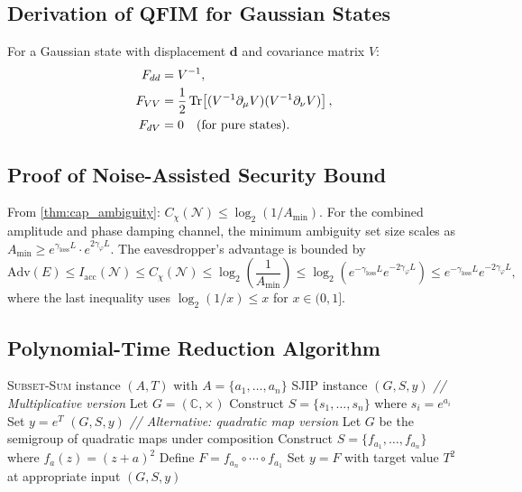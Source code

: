 \documentclass[12pt,a4paper]{article}
\theoremstyle{definition}
\theoremstyle{plain}
\begin{document}
\subsection{Derivation of QFIM for Gaussian States}

For a Gaussian state with displacement $\mathbf{d}$ and covariance matrix $V$:
\begin{align}
F_{dd} &= V^{-1}, \\
F_{VV} &= \frac{1}{2}\Tr\!\left[(V^{-1}\partial_\mu V)(V^{-1}\partial_\nu V)\right], \\
F_{dV} &= 0\quad\text{(for pure states)}.
\end{align}

\subsection{Proof of Noise-Assisted Security Bound}

From \cref{thm:cap_ambiguity}: $C_\chi(\mathcal{N})\le\log_2(1/A_{\min})$.
For the combined amplitude and phase damping channel, the minimum ambiguity set
size scales as $A_{\min}\ge e^{\gamma_{\mathrm{loss}}L}\cdot e^{2\gamma_\varphi L}$.
The eavesdropper's advantage is bounded by
\begin{equation}
\mathrm{Adv}(E)\le I_{\mathrm{acc}}(\mathcal{N})\le C_\chi(\mathcal{N})\le\log_2\!\left(\frac{1}{A_{\min}}\right)
\le\log_2\!\left(e^{-\gamma_{\mathrm{loss}}L}e^{-2\gamma_\varphi L}\right)\le e^{-\gamma_{\mathrm{loss}}L}e^{-2\gamma_\varphi L},
\end{equation}
where the last inequality uses $\log_2(1/x)\le x$ for $x\in(0,1]$.

\subsection{Polynomial-Time Reduction Algorithm}

\begin{algorithm}[H]
\caption{Polynomial-Time Reduction: \textsc{Subset-Sum} to SJIP}
\begin{algorithmic}[1]
\Require \textsc{Subset-Sum} instance $(A,T)$ with $A=\{a_1,\dots,a_n\}$
\Ensure SJIP instance $(G,S,y)$
\State \textit{// Multiplicative version}
\State Let $G=(\mathbb{C},\times)$
\State Construct $S=\{s_1,\dots,s_n\}$ where $s_i=e^{a_i}$
\State Set $y=e^T$
\Return $(G,S,y)$
\State \textit{// Alternative: quadratic map version}
\State Let $G$ be the semigroup of quadratic maps under composition
\State Construct $S=\{f_{a_1},\dots,f_{a_n}\}$ where $f_a(z)=(z+a)^2$
\State Define $F=f_{a_n}\circ\cdots\circ f_{a_1}$
\State Set $y=F$ with target value $T^2$ at appropriate input
\Return $(G,S,y)$
\end{algorithmic}
\end{algorithm}
\end{document}
